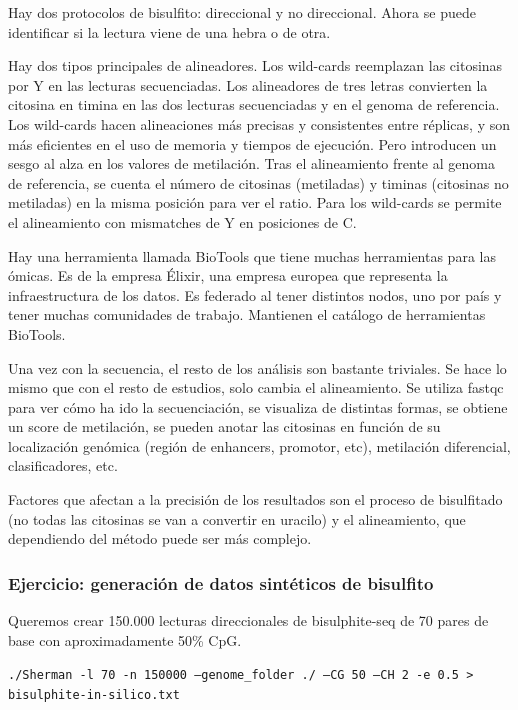 Hay dos protocolos de bisulfito: direccional y no direccional. Ahora se puede identificar si la lectura viene de una hebra o de otra. 

Hay dos tipos principales de alineadores. Los wild-cards reemplazan las citosinas por Y en las lecturas secuenciadas. Los alineadores de tres letras convierten la citosina en timina en las dos lecturas secuenciadas y en el genoma de referencia. 
Los wild-cards hacen alineaciones más precisas y consistentes entre réplicas, y son más eficientes en el uso de memoria y tiempos de ejecución. Pero introducen un sesgo al alza en los valores de metilación. Tras el alineamiento frente al genoma de referencia, se cuenta el número de citosinas (metiladas) y timinas (citosinas no metiladas) en la misma posición para ver el ratio. Para los wild-cards se permite el alineamiento con mismatches de Y en posiciones de C. 

Hay una herramienta llamada BioTools que tiene muchas herramientas para las ómicas. Es de la empresa Élixir, una empresa europea que representa la infraestructura de los datos. Es federado al tener distintos nodos, uno por país y tener muchas comunidades de trabajo. Mantienen el catálogo de herramientas BioTools. 

Una vez con la secuencia, el resto de los análisis son bastante triviales. Se hace lo mismo que con el resto de estudios, solo cambia el alineamiento. Se utiliza fastqc para ver cómo ha ido la secuenciación, se visualiza de distintas formas, se obtiene un score de metilación, se pueden anotar las citosinas en función de su localización genómica (región de enhancers, promotor, etc), metilación diferencial, clasificadores, etc.

Factores que afectan a la precisión de los resultados son el proceso de bisulfitado (no todas las citosinas se van a convertir en uracilo) y el alineamiento, que dependiendo del método puede ser más complejo. 

\subsubsection{Ejercicio: generación de datos sintéticos de bisulfito}
Queremos crear 150.000 lecturas direccionales de bisulphite-seq de 70 pares de base con aproximadamente 50\% CpG. 

\texttt{./Sherman -l 70 -n 150000 --genome_folder ./ --CG 50 --CH 2 -e 0.5 > bisulphite-in-silico.txt}
